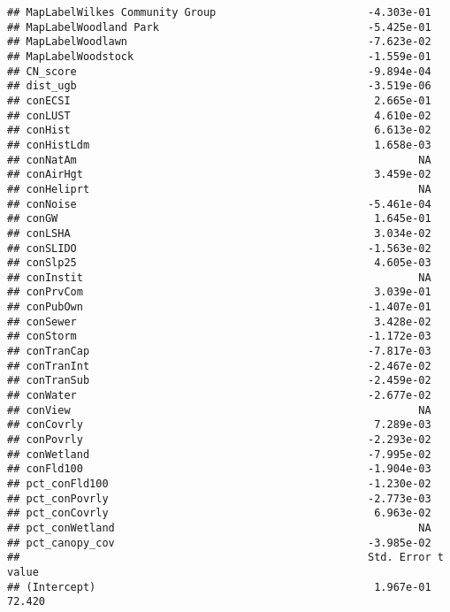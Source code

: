 \documentclass[]{article}
\begin{document}
\begin{verbatim}
## MapLabelWilkes Community Group                        -4.303e-01
## MapLabelWoodland Park                                 -5.425e-01
## MapLabelWoodlawn                                      -7.623e-02
## MapLabelWoodstock                                     -1.559e-01
## CN_score                                              -9.894e-04
## dist_ugb                                              -3.519e-06
## conECSI                                                2.665e-01
## conLUST                                                4.610e-02
## conHist                                                6.613e-02
## conHistLdm                                             1.658e-03
## conNatAm                                                      NA
## conAirHgt                                              3.459e-02
## conHeliprt                                                    NA
## conNoise                                              -5.461e-04
## conGW                                                  1.645e-01
## conLSHA                                                3.034e-02
## conSLIDO                                              -1.563e-02
## conSlp25                                               4.605e-03
## conInstit                                                     NA
## conPrvCom                                              3.039e-01
## conPubOwn                                             -1.407e-01
## conSewer                                               3.428e-02
## conStorm                                              -1.172e-03
## conTranCap                                            -7.817e-03
## conTranInt                                            -2.467e-02
## conTranSub                                            -2.459e-02
## conWater                                              -2.677e-02
## conView                                                       NA
## conCovrly                                              7.289e-03
## conPovrly                                             -2.293e-02
## conWetland                                            -7.995e-02
## conFld100                                             -1.904e-03
## pct_conFld100                                         -1.230e-02
## pct_conPovrly                                         -2.773e-03
## pct_conCovrly                                          6.963e-02
## pct_conWetland                                                NA
## pct_canopy_cov                                        -3.985e-02
##                                                       Std. Error t value
## (Intercept)                                            1.967e-01  72.420

\end{verbatim}
\end{document}
